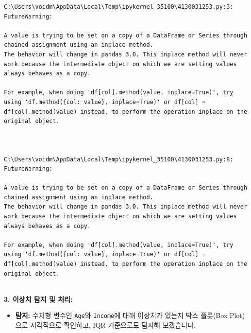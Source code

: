 \documentclass[
  letterpaper,
]{book}
\providecommand{\tightlist}{%
  \setlength{\itemsep}{0pt}\setlength{\parskip}{0pt}}
\begin{document}
\begin{verbatim}
C:\Users\voidm\AppData\Local\Temp\ipykernel_35100\4130031253.py:3: FutureWarning:

A value is trying to be set on a copy of a DataFrame or Series through chained assignment using an inplace method.
The behavior will change in pandas 3.0. This inplace method will never work because the intermediate object on which we are setting values always behaves as a copy.

For example, when doing 'df[col].method(value, inplace=True)', try using 'df.method({col: value}, inplace=True)' or df[col] = df[col].method(value) instead, to perform the operation inplace on the original object.



C:\Users\voidm\AppData\Local\Temp\ipykernel_35100\4130031253.py:8: FutureWarning:

A value is trying to be set on a copy of a DataFrame or Series through chained assignment using an inplace method.
The behavior will change in pandas 3.0. This inplace method will never work because the intermediate object on which we are setting values always behaves as a copy.

For example, when doing 'df[col].method(value, inplace=True)', try using 'df.method({col: value}, inplace=True)' or df[col] = df[col].method(value) instead, to perform the operation inplace on the original object.


\end{verbatim}

\textbf{3. 이상치 탐지 및 처리:}

\begin{itemize}
\tightlist
\item
  \textbf{탐지:} 수치형 변수인 \texttt{Age}와 \texttt{Income}에 대해
  이상치가 있는지 박스 플롯(Box Plot)으로 시각적으로 확인하고, IQR
  기준으로도 탐지해 보겠습니다.
\end{itemize}
\end{document}
